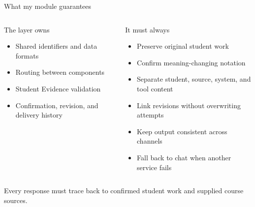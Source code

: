 \documentclass[aspectratio=169,10pt]{beamer}
\begin{document}
\begin{frame}{What my module guarantees}
\begin{columns}[T,onlytextwidth]
\begin{block}{The layer owns}
\begin{itemize}
\item Shared identifiers and data formats
\item Routing between components
\item Student Evidence validation
\item Confirmation, revision, and delivery history
\end{itemize}
\end{block}
\begin{block}{It must always}
\begin{itemize}
\item Preserve original student work
\item Confirm meaning-changing notation
\item Separate student, source, system, and tool content
\item Link revisions without overwriting attempts
\item Keep output consistent across channels
\item Fall back to chat when another service fails
\end{itemize}
\end{block}
\end{columns}
\vspace{.5em}
\centering
Every response must trace back to confirmed student work and supplied course sources.
\end{frame}
\end{document}
